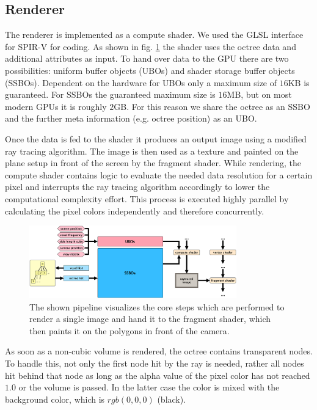 \documentclass[12pt,conference]{IEEEtran}
\begin{document}
\subsection{Renderer}
\label{sec:renderer}
The renderer is implemented as a compute shader. We used the GLSL interface for SPIR-V for coding. As shown in fig. \ref{fig:renderingprocess} the shader uses the octree data and additional attributes as input. To hand over data to the GPU there are two possibilities: uniform buffer objects (UBOs) and shader storage buffer objects (SSBOs)\cite{vulkan1.0.38spec}. Dependent on the hardware for UBOs only a maximum size of $16$KB is guaranteed. For SSBOs the guaranteed maximum size is $16$MB, but on most modern GPUs it is roughly $2$GB\cite{willems2016vulkan}. For this reason we share the octree as an SSBO and the further meta information (e.g. octree position) as an UBO.
\par
Once the data is fed to the shader it produces an output image using a modified ray tracing algorithm. The image is then used as a texture and painted on the plane setup in front of the screen by the fragment shader. While rendering, the compute shader contains logic to evaluate the needed data resolution for a certain pixel and interrupts the ray tracing algorithm accordingly to lower the computational complexity effort. This process is executed highly parallel by calculating the pixel colors independently and therefore concurrently.

\begin{figure}[htp]
	\centering
	\includegraphics[width=0.8\textwidth]{images/rendering_process.png}
	\caption{The shown pipeline visualizes the core steps which are performed to render a single image and hand it to the fragment shader, which then paints it on the polygons in front of the camera.}
	\label{fig:renderingprocess}
\end{figure}

As soon as a non-cubic volume is rendered, the octree contains transparent nodes. To handle this, not only the first node hit by the ray is needed, rather all nodes hit behind that node as long as the alpha value of the pixel color has not reached $1.0$ or the volume is passed. In the latter case the color is mixed with the background color, which is $rgb(0, 0, 0)$ (black).
\end{document}
